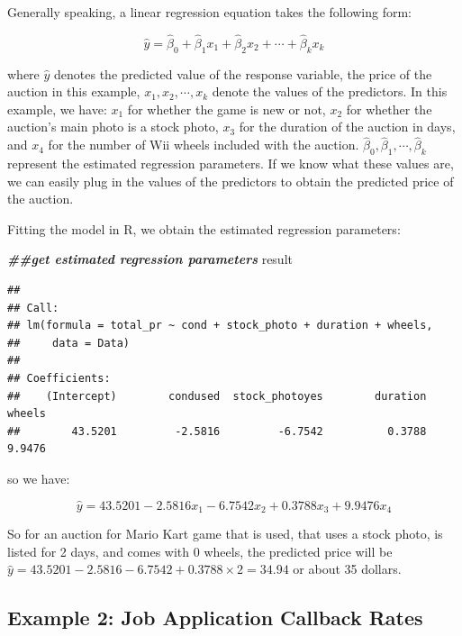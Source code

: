 \documentclass[
]{book}
\newenvironment{Shaded}{\begin{snugshade}}{\end{snugshade}}
\newcommand{\DocumentationTok}[1]{\textcolor[rgb]{0.56,0.35,0.01}{\textbf{\textit{#1}}}}
\newcommand{\NormalTok}[1]{#1}
\begin{document}
Generally speaking, a linear regression equation takes the following form:

\[
\hat{y} = \hat{\beta}_0 + \hat{\beta}_1 x_1 + \hat{\beta}_2 x_2 + \cdots + \hat{\beta}_k x_k
\]

where \(\hat{y}\) denotes the predicted value of the response variable, the price of the auction in this example, \(x_1, x_2, \cdots, x_k\) denote the values of the predictors. In this example, we have: \(x_1\) for whether the game is new or not, \(x_2\) for whether the auction's main photo is a stock photo, \(x_3\) for the duration of the auction in days, and \(x_4\) for the number of Wii wheels included with the auction. \(\hat{\beta}_0, \hat{\beta}_1, \cdots, \hat{\beta}_k\) represent the estimated regression parameters. If we know what these values are, we can easily plug in the values of the predictors to obtain the predicted price of the auction.

Fitting the model in R, we obtain the estimated regression parameters:

\begin{Shaded}
\begin{Highlighting}[]
\DocumentationTok{\#\#get estimated regression parameters}
\NormalTok{result}
\end{Highlighting}
\end{Shaded}

\begin{verbatim}
## 
## Call:
## lm(formula = total_pr ~ cond + stock_photo + duration + wheels, 
##     data = Data)
## 
## Coefficients:
##    (Intercept)        condused  stock_photoyes        duration          wheels  
##        43.5201         -2.5816         -6.7542          0.3788          9.9476
\end{verbatim}

so we have:

\[
\hat{y} = 43.5201 - 2.5816 x_1 - 6.7542 x_2 + 0.3788 x_3 + 9.9476 x_4
\]

So for an auction for Mario Kart game that is used, that uses a stock photo, is listed for 2 days, and comes with 0 wheels, the predicted price will be \(\hat{y} = 43.5201 - 2.5816 - 6.7542 + 0.3788 \times 2 = 34.94\) or about 35 dollars.

\hypertarget{example-2-job-application-callback-rates}{%
\subsection*{Example 2: Job Application Callback Rates}\label{example-2-job-application-callback-rates}}
\end{document}

